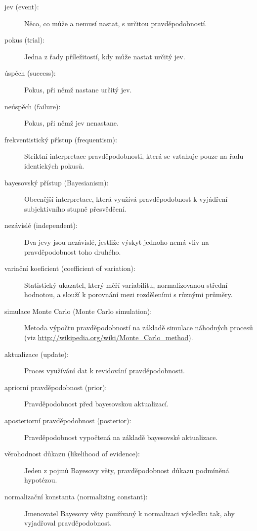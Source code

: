 \documentclass[12pt]{book}
\begin{document}
\begin{description}

\item[jev (event):] Něco, co může a nemusí nastat, s určitou pravděpodobností.

\item[pokus (trial):] Jedna z řady příležitostí, kdy může nastat určitý jev.

\item[úspěch (success):] Pokus, při němž nastane určitý jev.

\item[neúspěch (failure):] Pokus, při němž jev nenastane.

\item[frekventistický přístup (frequentism):] Striktní interpretace pravděpodobnosti, která se vztahuje pouze na řadu identických pokusů.

\item[bayesovský přístup (Bayesianism):] Obecnější interpretace, která využívá pravděpodobnost k vyjádření subjektivního stupně přesvědčení.

\item[nezávislé (independent):] Dva jevy jsou nezávislé, jestliže výskyt jednoho nemá vliv na pravděpodobnost toho druhého.

\item[variační koeficient (coefficient of variation):] Statistický ukazatel, který měří variabilitu, normalizovanou střední hodnotou, a slouží k porovnání mezi rozděleními s různými průměry.

\item[simulace Monte Carlo (Monte Carlo simulation):] Metoda výpočtu pravděpodobností na základě simulace náhodných procesů (viz
  \url{http://wikipedia.org/wiki/Monte_Carlo_method}).

\item[aktualizace (update):] Proces využívání dat k revidování pravděpodobnosti.

\item[apriorní pravděpodobnost (prior):] Pravděpodobnost před bayesovskou aktualizací.

\item[aposteriorní pravděpodobnost (posterior):] Pravděpodobnost vypočtená na základě bayesovské aktualizace.

\item[věrohodnost důkazu (likelihood of evidence):] Jeden z pojmů Bayesovy věty, pravděpodobnost důkazu podmíněná hypotézou.

\item[normalizační konstanta (normalizing constant):] Jmenovatel Bayesovy věty používaný k normalizaci výsledku tak, aby vyjadřoval pravděpodobnost.

\end{description}
\end{document}
